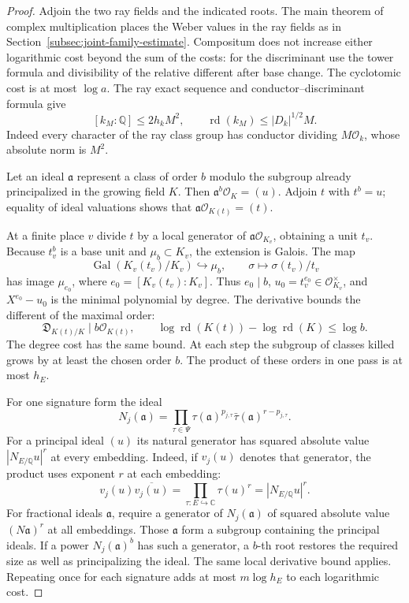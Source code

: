 \begin{proof}
Adjoin the two ray fields and the indicated roots. The main theorem
of complex multiplication places the Weber values in the ray fields
as in Section~\ref{subsec:joint-family-estimate}. Compositum does
not increase either logarithmic cost beyond the sum of the costs:
for the discriminant use the tower formula and divisibility of the
relative different after base change. The cyclotomic cost is at most
\(\log a\). The ray exact sequence and conductor--discriminant formula give
\[
  [k_M:\mathbb Q]\le2h_k M^2,\qquad
   \operatorname{rd}(k_M)\le |D_k|^{1/2} M .
\]
Indeed every character of the ray class group has conductor dividing
\(M\mathcal O_k\), whose absolute norm is \(M^2\).

Let an ideal \(\mathfrak a\) represent a class of order \(b\)
modulo the subgroup already principalized in the growing field \(K\).
Then \(\mathfrak a^b\mathcal O_K=(u)\). Adjoin \(t\) with
\(t^b=u\); equality of ideal valuations shows that
\(\mathfrak a\mathcal O_{K(t)}=(t)\).

At a finite place \(v\) divide \(t\) by a local generator of
\(\mathfrak a\mathcal O_{K_v}\), obtaining a unit \(t_v\).
Because \(t_v^b\) is a base unit and \(\mu_b\subset K_v\), the
extension is Galois. The map
\[
 \operatorname{Gal}(K_v(t_v)/K_v)\hookrightarrow\mu_b,\qquad
          \sigma\longmapsto \sigma(t_v)/t_v
\]
has image \(\mu_{e_0}\), where \(e_0=[K_v(t_v):K_v]\).
Thus \(e_0\mid b\), \(u_0=t_v^{e_0}\in\mathcal O_{K_v}^{\times}\),
and \(X^{e_0}-u_0\) is the minimal polynomial by degree.
The derivative bounds the different of the maximal order:
\[
   \mathfrak D_{K(t)/K}\mid b\mathcal O_{K(t)},\qquad
   \log\operatorname{rd}(K(t))-\log\operatorname{rd}(K)\le\log b .
\]
The degree cost has the same bound. At each step the subgroup of
classes killed grows by at least the chosen order \(b\). The product
of these orders in one pass is at most \(h_E\).

For one signature form the ideal
\[
 N_j(\mathfrak a)=
   \prod_{\tau\in\Psi}\tau(\mathfrak a)^{p_{j,\tau}}
             \bar\tau(\mathfrak a)^{r-p_{j,\tau}} .
\]
For a principal ideal \((u)\) its natural generator has squared
absolute value \(|N_{E/\mathbb Q}u|^r\) at every embedding.
Indeed, if \(v_j(u)\) denotes that generator, the product uses
exponent \(r\) at each embedding:
\[
       v_j(u)\overline{v_j(u)}
               =\prod_{\tau:E\hookrightarrow\mathbb C}\tau(u)^r
               =|N_{E/\mathbb Q}u|^r .
\]
For fractional ideals \(\mathfrak a\), require a generator
of \(N_j(\mathfrak a)\) of squared absolute value
\((N\mathfrak a)^r\) at all embeddings. Those \(\mathfrak a\)
form a subgroup containing the principal ideals. If a
power \(N_j(\mathfrak a)^b\) has such a generator, a \(b\)-th
root restores the required size as well as principalizing the ideal.
The same local derivative bound applies. Repeating once for each
signature adds at most \(m\log h_E\) to each logarithmic cost.
\end{proof}

